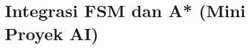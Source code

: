 \documentclass[../../main.tex]{subfiles}
\begin{document}
\chapter{Integrasi FSM dan A* (Mini Proyek AI)}
\label{chap:integrasi}
























\ifSubfilesClassLoaded{%
  \clearpage
}{}
\end{document}
